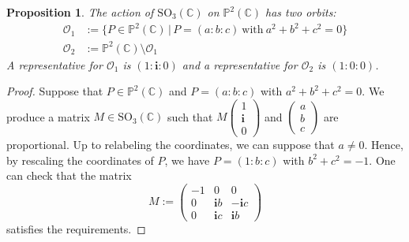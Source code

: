 \documentclass[11pt, a4paper, reqno, captions=tableheading,bibliography=totoc]{scrartcl}
\theoremstyle{plain}
\newtheorem{prop}[lemma]{Proposition}
\theoremstyle{definition}
\newcommand{\C}{\mathbb{C}}
\newcommand{\p}{\mathbb{P}}
\newcommand{\iii}{\textbf{i}}
\begin{document}
\begin{prop}
\label{two_orbits}
 The action of $\mathrm{SO}_3(\mathbb{C})$ on $\p^2(\C)$ has two orbits:
 \begin{align*}
  \mathcal{O}_1 &:=
  \bigl\{
   P \in \p^2(\C) \, | \,
   P = (a:b:c) \  \text{with} \  a^2 + b^2 + c^2 = 0
  \bigr\} \\
  \mathcal{O}_2 &:= \p^2(\C) \setminus \mathcal{O}_1
 \end{align*}
 A representative for $\mathcal{O}_1$ is $(1:\iii:0)$ and a
representative for $\mathcal{O}_2$ is $(1:0:0)$.
\end{prop}
\begin{proof}
 Suppose that $P \in \p^2(\C)$ and $P = (a:b:c)$ with $a^2 + b^2 + c^2 = 0$.
 We produce a matrix $M \in \mathrm{SO}_3(\C)$ such that $M \left(\begin{smallmatrix} 1 \\ \iii \\ 0 \end{smallmatrix}\right)$ and $\left(\begin{smallmatrix} a \\ b \\ c \end{smallmatrix}\right)$ are proportional.
 Up to relabeling the coordinates, we can suppose that $a \neq 0$.
 Hence, by rescaling the coordinates of $P$, we have $P = (1: b: c)$ with $b^2 + c^2 = -1$.
 One can check that the matrix
 \[
  M :=
  \begin{pmatrix}
   -1 & 0 & 0 \\
   0 & \iii b & -\iii c \\
   0 & \iii c & \iii b
  \end{pmatrix}
 \]
 satisfies the requirements.


\end{proof}
\end{document}
